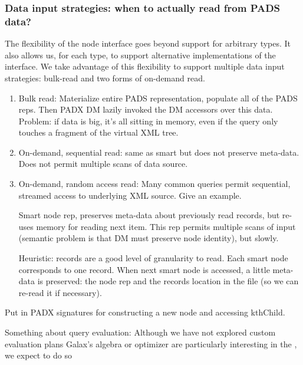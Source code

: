 \subsubsection{Data input strategies: when to actually read from PADS data?}

The flexibility of the node interface goes beyond support for
arbitrary \pads{} types. It also allows us, for each type, to support
alternative implementations of the interface. We take advantage of
this flexibility to support multiple data input strategies: bulk-read
and two forms of on-demand read.

\begin{enumerate}
\item Bulk read: Materialize entire PADS representation, populate all of the PADS
reps.  Then PADX DM lazily invoked the DM accessors over this data.
Problem: if data is big, it's all sitting in memory, even if the query
only touches a fragment of the virtual XML tree.

\item On-demand, sequential read: same as smart but does not preserve meta-data.
   Does not permit multiple scans of data source. 

\item On-demand, random access read: 
Many common queries permit sequential, streamed access to underlying
XML source.  Give an example.  

Smart node rep, preserves meta-data about previously read records, but
re-uses memory for reading next item.  This rep permits multiple scans
of input (semantic problem is that DM must preserve node identity),
but slowly. 

Heuristic: records are a good level of granularity to read.   Each
smart node corresponds to one record.  When next smart node is
accessed, a little meta-data is preserved: the node rep and the
records location in the file (so we can re-read it if necessary).
\end{enumerate}

Put in PADX signatures for constructing a new node and accessing
kthChild. 

Something about query evaluation:
Although we have not explored custom evaluation plans 
Galax's algebra or optimizer are particularly interesting in the 
\padx{}, we expect to do so 

